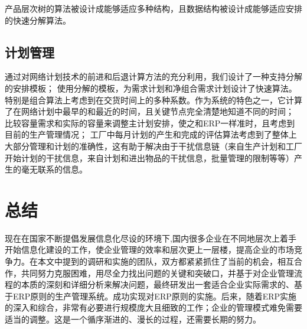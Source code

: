 产品层次树的算法被设计成能够适应多种结构，且数据结构被设计成能够适应安排的快速分解算法。

\subsection{计划管理}

通过对网络计划技术的前进和后退计算方法的充分利用，我们设计了一种支持分解的安排模板；
使用分解的模板，为需求计划和净组合需求计划设计了快速算法。特别是组合算法上考虑到在交货时间上的多种系数。作为系统的特色之一，它计算了在网络计划中最早的和最近的时间，且关键节点完全清楚地知道不同的时间；
比较容量需求和实际的容量来调整主计划安排，使之和ERP一样准时，且考虑到目前的生产管理情况；
工厂中每月计划的产生和完成的评估算法考虑到了整体上大部分管理和计划的准确性，这有助于解决由于干扰信息链（来自生产计划和工厂开始计划的干扰信息，来自计划和进出物品的干扰信息，批量管理的限制等等）产生的毫无联系的信息。

\section{总结}

现在在国家不断提倡发展信息化尽设的环境下,国内很多企业在不同地层次上着手开始信息化建设的工作，使企业管理的效率和层次更上一层楼，提高企业的市场竞争力。在本文中提到的调研和实施的团队，双方都紧紧抓住了当前的机会，相互合作，共同努力克服困难，用尽全力找出问题的关键和突破口，并基于对企业管理流程的本质的深刻和详细分析来解决问题，最终研发出一套适合企业实际需求的、基于ERP原则的生产管理系统。成功实现对ERP原则的实施。后来，随着ERP实施的深入和综合，非常有必要进行规模庞大且细致的工作；企业的管理模式难免需要适当的调整。这是一个循序渐进的、漫长的过程，还需要长期的努力。


